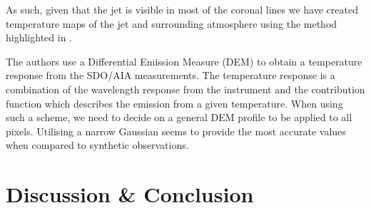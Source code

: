 \documentclass{emulateapj}
\begin{document}
As such, given that the jet is visible in most of the coronal lines we have created temperature maps of the jet and surrounding atmosphere using the method highlighted in \cite{Leonard2014}.

The authors use a Differential Emission Measure (DEM) to obtain a temperature response from the SDO/AIA measurements.
The temperature response is a combination of the wavelength response from the instrument and the contribution function which describes the emission from a given temperature.
When using such a scheme, we need to decide on a general DEM profile to be applied to all pixels.
Utilising a narrow Gaussian seems to provide the most accurate values when compared to synthetic observations.






\section{Discussion \& Conclusion}





\end{document}
